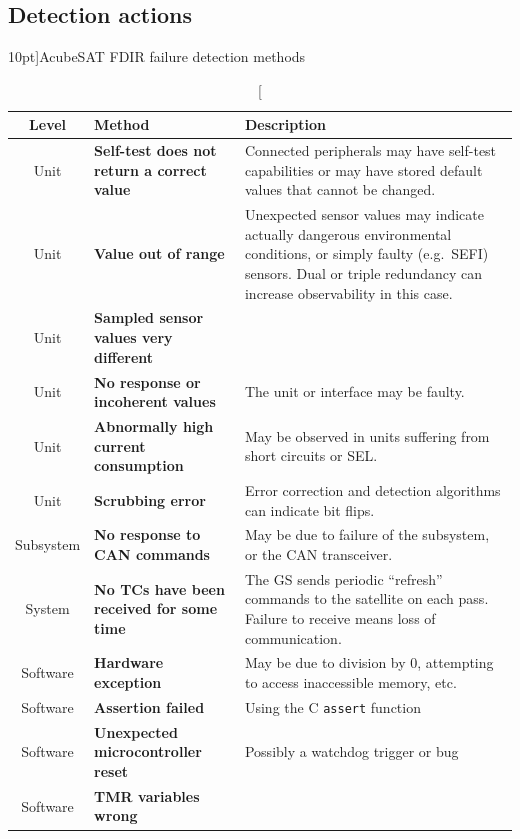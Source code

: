 \documentclass[a4paper,nobib,final]{tufte-book}
\begin{document}
\subsection{Detection actions}
\begin{table}[h]
	\centering
	\caption[][10pt]{AcubeSAT \acs{FDIR} failure detection methods}
	\label{tab:fdir_detect}
	\renewcommand{\arraystretch}{1.3}
	\begin{tabularx}{\textwidth}{@{}cL{5cm}X@{}}
		\toprule
		Level & Method & Description \\ \midrule
		Unit & \textbf{Self-test does not return a correct value} & Connected peripherals may have self-test capabilities or may have stored default values that cannot be changed. \\
		Unit & \textbf{Value out of range} & Unexpected sensor values may indicate actually dangerous environmental conditions, or simply faulty (e.g.\ \acs{SEFI}) sensors. Dual or triple redundancy can increase observability in this case. \\
		Unit & \textbf{Sampled sensor values very different} & \\
		Unit & \textbf{No response or incoherent values} & The unit or interface may be faulty. \\
		Unit & \textbf{Abnormally high current consumption} & May be observed in units suffering from short circuits or \acs{SEL}. \\
		Unit & \textbf{Scrubbing error} & Error correction and detection algorithms can indicate bit flips. \\
		Subsystem & \textbf{No response to \acs{CAN} commands} & May be due to failure of the subsystem, or the \acs{CAN} transceiver. \\
		System & \textbf{No \acsp{TC} have been received for some time} & The \acs{GS} sends periodic ``refresh'' commands to the satellite on each pass. Failure to receive means loss of communication. \\
		Software & \textbf{Hardware exception} & May be due to division by 0, attempting to access inaccessible memory, etc. \\
		Software & \textbf{Assertion failed} & Using the C \texttt{assert} function \\
		Software & \textbf{Unexpected microcontroller reset} & Possibly a watchdog trigger \parencite{beningo_review_watchdog_2010} or bug \\
		Software & \textbf{\acs{TMR} variables wrong} & \\ \bottomrule
	\end{tabularx}
\end{table}
\end{document}
